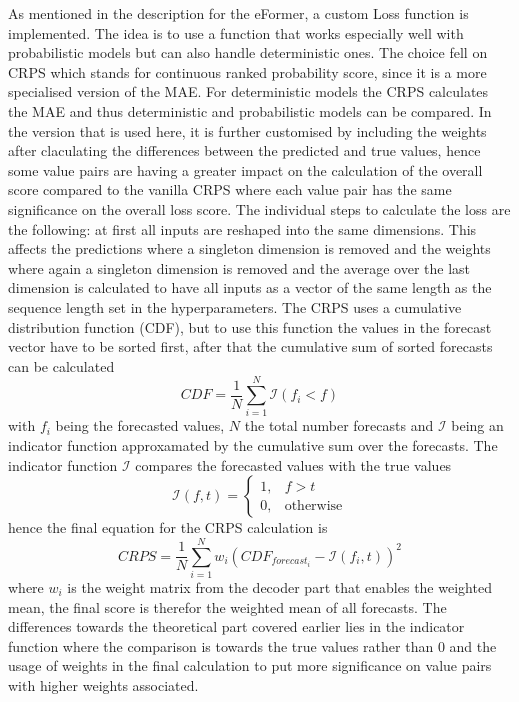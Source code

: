 \documentclass{article}
\begin{document}
As mentioned in the description for the eFormer, a custom Loss function is implemented. The idea is to use a function that works especially well with probabilistic models but can also handle deterministic ones. The choice fell on CRPS which stands for continuous ranked probability score, since it is a more specialised version of the MAE. For deterministic models the CRPS calculates the MAE and thus deterministic and probabilistic models can be compared. In the version that is used here, it is further customised by including the weights after claculating the differences between the predicted and true values, hence some value pairs are having a greater impact on the calculation of the overall score compared to the vanilla CRPS where each value pair has the same significance on the overall loss score. The individual steps to calculate the loss are the following: at first all inputs are reshaped into the same dimensions. This affects the predictions where a singleton dimension is removed and the weights where again a singleton dimension is removed and the average over the last dimension is calculated to have all inputs as a vector of the same length as the sequence length set in the hyperparameters. The CRPS uses a cumulative distribution function (CDF), but to use this function the values in the forecast vector have to be sorted first, after that the cumulative sum of sorted forecasts can be calculated
\begin{equation}
    CDF = \frac{1}{N} \sum^N_{i = 1} \mathcal{I}(f_i < f)
\end{equation}
with $f_i$ being the forecasted values, $N$ the total number forecasts and $\mathcal{I}$ being an indicator function approxamated by the cumulative sum over the forecasts. The indicator function $\mathcal{I}$ compares the forecasted values with the true values
\begin{equation}
    \mathcal{I} (f,t) = \begin{cases}
        1, & f > t \\
        0, & \text{otherwise}
    \end{cases}
\end{equation}
hence the final equation for the CRPS calculation is
\begin{equation}
    CRPS = \frac{1}{N} \sum^N_{i = 1} w_i (CDF_{forecast_i} - \mathcal{I}(f_i,t))^2
\end{equation}
where $w_i$ is the weight matrix from the decoder part that enables the weighted mean, the final score is therefor the weighted mean of all forecasts. The differences towards the theoretical part covered earlier lies in the indicator function where the comparison is towards the true values rather than $0$ and the usage of weights in the final calculation to put more significance on value pairs with higher weights associated.

\newpage

\printbibliography
\end{document}
